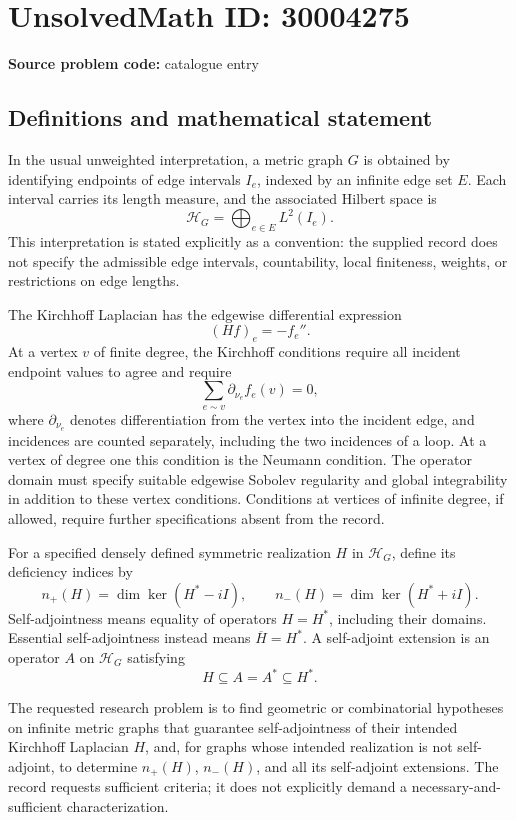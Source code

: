 \documentclass[11pt]{article}
\begin{document}
\section*{UnsolvedMath ID: 30004275}
\textbf{Source problem code:} catalogue entry
\subsection{Definitions and mathematical statement}
In the usual unweighted interpretation, a metric graph \(G\) is obtained by identifying endpoints of edge intervals \(I_e\), indexed by an infinite edge set \(E\). Each interval carries its length measure, and the associated Hilbert space is
\[
\mathcal H_G=\bigoplus_{e\in E}L^2(I_e).
\]
This interpretation is stated explicitly as a convention: the supplied record does not specify the admissible edge intervals, countability, local finiteness, weights, or restrictions on edge lengths.

The Kirchhoff Laplacian has the edgewise differential expression
\[
(Hf)_e=-f_e''.
\]
At a vertex \(v\) of finite degree, the Kirchhoff conditions require all incident endpoint values to agree and require
\[
\sum_{e\sim v}\partial_{\nu_e}f_e(v)=0,
\]
where \(\partial_{\nu_e}\) denotes differentiation from the vertex into the incident edge, and incidences are counted separately, including the two incidences of a loop. At a vertex of degree one this condition is the Neumann condition. The operator domain must specify suitable edgewise Sobolev regularity and global integrability in addition to these vertex conditions. Conditions at vertices of infinite degree, if allowed, require further specifications absent from the record.

For a specified densely defined symmetric realization \(H\) in \(\mathcal H_G\), define its deficiency indices by
\[
n_+(H)=\dim\ker(H^*-iI),\qquad
n_-(H)=\dim\ker(H^*+iI).
\]
Self-adjointness means equality of operators \(H=H^*\), including their domains. Essential self-adjointness instead means \(\overline H=H^*\). A self-adjoint extension is an operator \(A\) on \(\mathcal H_G\) satisfying
\[
H\subseteq A=A^*\subseteq H^*.
\]

The requested research problem is to find geometric or combinatorial hypotheses on infinite metric graphs that guarantee self-adjointness of their intended Kirchhoff Laplacian \(H\), and, for graphs whose intended realization is not self-adjoint, to determine \(n_+(H)\), \(n_-(H)\), and all its self-adjoint extensions. The record requests sufficient criteria; it does not explicitly demand a necessary-and-sufficient characterization.
\end{document}
